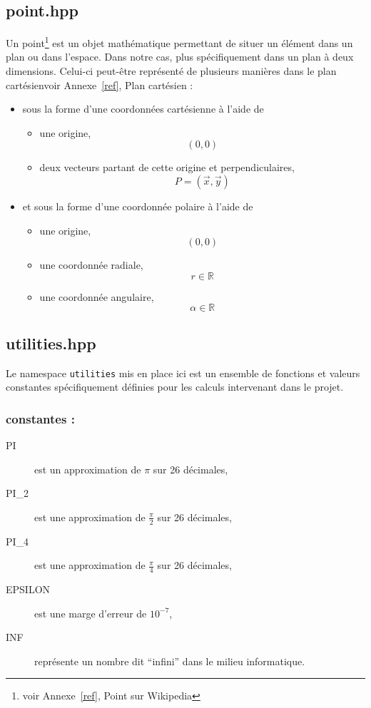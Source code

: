 \documentclass[a4paper,11pt]{report}
\begin{document}
\subsection[Point]{point.hpp}
Un point\footnote{voir Annexe~\ref{ref}, Point sur Wikipedia}  est un objet mathématique permettant de situer un élément dans un plan
ou dans l'espace. Dans notre cas, plus spécifiquement dans un plan à deux
dimensions. Celui-ci peut-être représenté de plusieurs manières dans le plan 
cartésien{voir Annexe~\ref{ref}, Plan cartésien} : 
\begin{itemize}
	\item sous la forme d'une coordonnées cartésienne à l'aide de 
		\begin{itemize}
			\item une origine, $$(0, 0)$$
			\item deux vecteurs partant de cette origine et perpendiculaires,
				$$P = (\vec{x}, \vec{y})$$
		\end{itemize}
	\item et sous la forme d'une coordonnée polaire à l'aide de
		\begin{itemize}
			\item une origine, $$(0, 0)$$
			\item une coordonnée radiale, $$r \in \mathbb{R}$$
			\item une coordonnée angulaire, $$\alpha \in \mathbb{R}$$
		\end{itemize}
\end{itemize}
\subsection[Utilitaire]{utilities.hpp}
Le namespace \texttt{utilities} mis en place ici est un ensemble de fonctions et valeurs
constantes spécifiquement définies pour les calculs intervenant dans le projet.

\subsubsection{constantes :}
\begin{description}
	\item[PI] est un approximation de $\pi$ sur 26 décimales,
	\item[PI\_2] est une approximation de $\frac{\pi}{2}$ sur 26 décimales,
	\item[PI\_4] est une approximation de $\frac{\pi}{4}$ sur 26 décimales,
	\item[EPSILON] est une marge d'erreur de $10^{-7}$,
	\item[INF] représente un nombre dit ``infini'' dans le milieu informatique.
\end{description}
\end{document}
